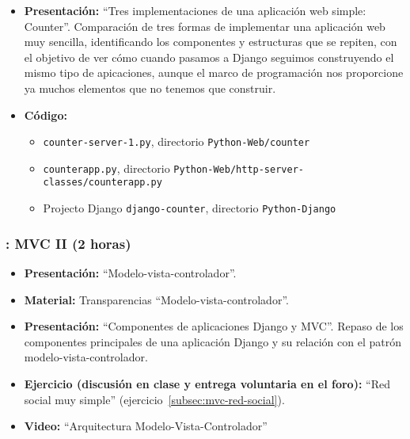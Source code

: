 \documentclass[a4paper,12pt]{article}
\begin{document}
\begin{itemize}
\item \textbf{Presentación:} ``Tres implementaciones de una aplicación web simple: Counter''. Comparación de tres formas de implementar una aplicación web muy sencilla, identificando los componentes y estructuras que se repiten, con el objetivo de ver cómo cuando pasamos a Django seguimos construyendo el mismo tipo de apicaciones, aunque el marco de programación nos proporcione ya muchos elementos que no tenemos que construir.
\item \textbf{Código:}
  \begin{itemize}
  \item \verb|counter-server-1.py|, directorio \verb|Python-Web/counter|
  \item \verb|counterapp.py|, directorio \verb|Python-Web/http-server-classes/counterapp.py|
  \item Projecto Django \verb|django-counter|, directorio \verb|Python-Django|
  \end{itemize}
\end{itemize}

\subsubsection{\lunesI: MVC II (2 horas)}
\label{cal:lunesI}

\begin{itemize}
\item \textbf{Presentación:} ``Modelo-vista-controlador''.
\item \textbf{Material:} Transparencias ``Modelo-vista-controlador''.
\item \textbf{Presentación:} ``Componentes de aplicaciones Django y MVC''.
  Repaso de los componentes principales de una aplicación Django y su relación con el patrón modelo-vista-controlador.
\item \textbf{Ejercicio (discusión en clase y entrega voluntaria en el foro):} ``Red social muy simple'' (ejercicio~\ref{subsec:mvc-red-social}).  
\item \textbf{Video:} ``Arquitectura Modelo-Vista-Controlador''
\end{itemize}
\end{document}
